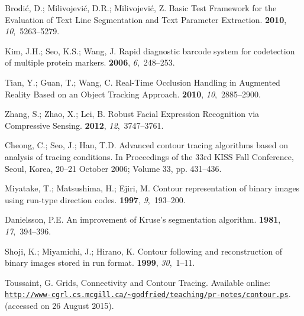 \documentclass[sensors,article,accept,moreauthors,pdftex,10pt,a4paper]{mdpi}
\begin{document}
\begin{thebibliography}{999}
Brodić, D.; Milivojević, D.R.; Milivojević, Z.
\newblock Basic Test Framework for the Evaluation of Text Line Segmentation and
 Text Parameter Extraction.
 {\bf 2010}, {\em 10},~5263--5279.

Kim, J.H.; Seo, K.S.; Wang, J.
\newblock Rapid diagnostic barcode system for codetection of multiple protein
 markers.
 {\bf 2006}, {\em 6},~248--253.

Tian, Y.; Guan, T.; Wang, C.
\newblock Real-Time Occlusion Handling in Augmented Reality Based on an Object
 Tracking Approach.
 {\bf 2010}, {\em 10},~2885--2900.

Zhang, S.; Zhao, X.; Lei, B.
\newblock Robust Facial Expression Recognition via Compressive Sensing.
 {\bf 2012}, {\em 12},~3747--3761.

Cheong, C.; Seo, J.; Han, T.D.
\newblock Advanced contour tracing algorithms based on analysis of tracing
 conditions.
\newblock In Proceedings of the 33rd KISS Fall Conference, Seoul, Korea, 20--21 October 2006; Volume
 33, pp. 431--436.

Miyatake, T.; Matsushima, H.; Ejiri, M.
\newblock Contour representation of binary images using run-type direction
 codes.
 {\bf 1997}, {\em 9},~193--200.

Danielsson, P.E.
\newblock An improvement of Kruse's segmentation algorithm.
 {\bf 1981}, {\em
 17},~394--396.

Shoji, K.; Miyamichi, J.; Hirano, K.
\newblock Contour following and reconstruction of binary images stored in run
 format.
 {\bf 1999}, {\em 30},~1--11.

Toussaint, G.
\newblock Grids, Connectivity and Contour Tracing.
\newblock
 Available online: \href{http://www-cgrl.cs.mcgill.ca/~godfried/teaching/pr-notes/contour.ps}{\nolinkurl{http://www-cgrl.cs.mcgill.ca/~godfried/teaching/pr-notes/contour.ps}}. (accessed on 26 August 2015).


\end{thebibliography}
\end{document}
